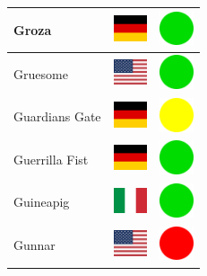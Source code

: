 \documentclass[12pt, a4paper, twoside]{report}
\begin{document}
\begin{center}
\begin{longtable}{|p{5cm}|p{2cm}|p{2cm}|}
 Groza                                                      & \includegraphics[width=1cm]{../img/flags/de} &   \includegraphics[width=1cm]{../likes/y} \\ \hline
 Gruesome                                                   & \includegraphics[width=1cm]{../img/flags/us} &   \includegraphics[width=1cm]{../likes/y} \\ \hline
 Guardians Gate                                             & \includegraphics[width=1cm]{../img/flags/de} &   \includegraphics[width=1cm]{../likes/m} \\ \hline
 Guerrilla Fist                                             & \includegraphics[width=1cm]{../img/flags/de} &   \includegraphics[width=1cm]{../likes/y} \\ \hline
 Guineapig                                                  & \includegraphics[width=1cm]{../img/flags/it} &   \includegraphics[width=1cm]{../likes/y} \\ \hline
 Gunnar                                                     & \includegraphics[width=1cm]{../img/flags/us} &   \includegraphics[width=1cm]{../likes/n} \\ \hline

\end{longtable}
\end{center}
\end{document}
